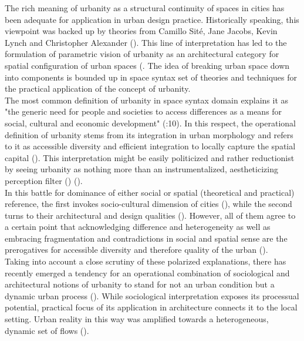 \documentclass[11pt]{report}
\begin{document}
The rich meaning of urbanity as a structural continuity of spaces in cities has been adequate for application in urban design practice. Historically speaking, this viewpoint was backed up by theories from Camillo Sité, Jane Jacobs, Kevin Lynch and Christopher Alexander (\cite{(Site, Jacobs, Lynch, Alexander)}).
This line of interpretation has led to the formulation of parametric vision of urbanity as an architectural category for spatial configuration of urban spaces (\cite{xxxx}.
The idea of breaking urban space down into components is bounded up in space syntax set of theories and techniques for the practical application of the concept of urbanity.
\\

The most common definition of urbanity in space syntax domain explains it as "the generic need for people and societies to access differences as a means for social, cultural and economic development" (\href{Marcus}{\citealt{marcus_spatial_2007}}:10).
In this respect, the operational definition of urbanity stems from its integration in urban morphology  and refers to it as accessible diversity and efficient integration to locally capture the spatial capital (\href{Marcus}{\cite{marcus_spatial_2007}}).
This interpretation might be easily politicized and rather reductionist by seeing urbanity as nothing more than an instrumentalized, aestheticizing perception filter (\href{Wuest}{\citealt{wust_urbanity_2005}}) (\cite{(Münkler 1989, Wüst 2005)}).
\\

In this battle for dominance of either social or spatial (theoretical and practical) reference, the first invokes socio-cultural dimension of cities (\cite{Durth 1987, Haussermann and Siebel 1997, Christiaanse 2000}), while the second turns to their architectural and design qualities (\cite{Neuffer 1976}).
However, all of them agree to a certain point that acknowledging difference and heterogeneity as well as embracing fragmentation and contradictions in social and spatial sense are the prerogatives for accessible diversity and therefore quality of the urban (\cite{(Durth 1986: 1838; Herterich, 1988: 273; Krämer-Badoni 1996: 75, Wust 2005, Marcus 2007)}). 
\\

Taking into account a close scrutiny of these polarized explanations, there has recently emerged a tendency for an operational combination of sociological and architectural notions of urbanity to stand for not an urban condition but a dynamic urban process (\cite{(Hortmann 1990)}).
While sociological interpretation exposes its processual potential, practical focus of its application in architecture connects it to the local setting.
Urban reality in this way was amplified towards a heterogeneous, dynamic set of flows (\href{de Aguiar}{\citealt{de_aguiar_douglas_vieira_what_2013}}).
\\
\end{document}

